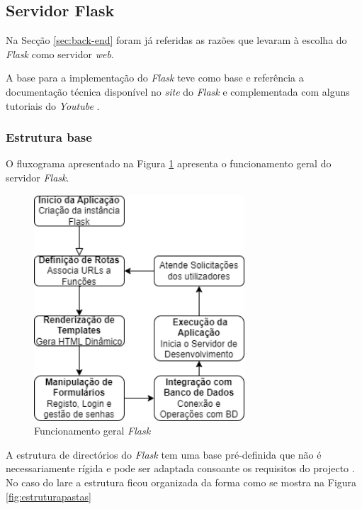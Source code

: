 \subsection{Servidor Flask}
\label{sec:flask}
Na Secção \ref{sec:back-end} foram já referidas as razões que levaram à escolha do \textit{Flask} como servidor \textit{web}. 

A base para a implementação do \textit{Flask} teve como base e referência a documentação técnica disponível no \textit{site} do \textit{Flask} \cite{Flask} e complementada com alguns tutoriais do \textit{Youtube} \cite{tutorialsiteflask, flaskDigitalOcean}.

\subsubsection{Estrutura base}
O fluxograma apresentado na Figura \ref{fig:funcflask} apresenta o funcionamento geral do servidor \textit{Flask}.

\begin{figure}[hbtp]
	\centering
	\includegraphics[width=0.7\textwidth]{figures/fluxograma_flask.drawio.png}
	\caption{Funcionamento geral \textit{Flask}}
	\label{fig:funcflask}
\end{figure}

A estrutura de directórios do \textit{Flask} tem uma base pré-definida que não é necessariamente rígida e pode ser adaptada consoante os requisitos do projecto \cite{Flask}. No caso do \acrshort{lare} a estrutura ficou organizada da forma como se mostra na Figura \ref{fig:estruturapastas}

